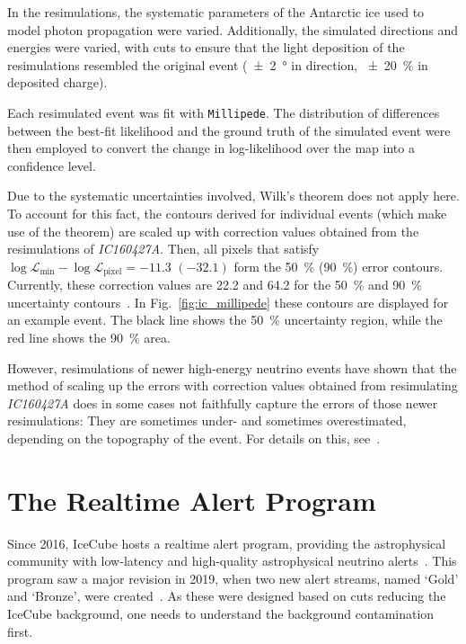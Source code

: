In the resimulations, the systematic parameters of the Antarctic ice used to model photon propagation were varied. Additionally, the simulated directions and energies were varied, with cuts to ensure that the light deposition of the resimulations resembled the original event (\SI{\pm2}{\degree} in direction, \SI{\pm20}{\percent} in deposited charge).

Each resimulated event was fit with \texttt{Millipede}. The distribution of differences between the best-fit likelihood and the ground truth of the simulated event were then employed to convert the change in log-likelihood over the map into a confidence level.

Due to the systematic uncertainties involved, Wilk's theorem does not apply here. To account for this fact, the contours derived for individual events (which make use of the theorem) are scaled up with correction values obtained from the resimulations of \emph{IC160427A}. Then, all pixels that satisfy $\log \mathcal{L}_\text{min}-\log \mathcal{L}_\text{pixel} = -11.3$ $(-32.1)$ form the \SI{50}{\percent} (\SI{90}{\percent}) error contours. Currently, these correction values are 22.2 and 64.2 for the \SI{50}{\percent} and \SI{90}{\percent} uncertainty contours~. In Fig.~\ref{fig:ic_millipede} these contours are displayed for an example event. The black line shows the \SI{50}{\percent} uncertainty region, while the red line shows the \SI{90}{\percent} area.

However, resimulations of newer high-energy neutrino events have shown that the method of scaling up the errors with correction values obtained from resimulating \emph{IC160427A} does in some cases not faithfully capture the errors of those newer resimulations: They are sometimes under- and sometimes overestimated, depending on the topography of the event. For details on this, see~\cite{Gualda2021}.

\section{The Realtime Alert Program}\label{ic_alert_program}
Since 2016, IceCube hosts a realtime alert program, providing the astrophysical community with low-latency and high-quality astrophysical neutrino alerts~\cite{Aartsen2017a}. This program saw a major revision in 2019, when two new alert streams, named `Gold' and `Bronze', were created~. As these were designed based on cuts reducing the IceCube background, one needs to understand the background contamination first.

